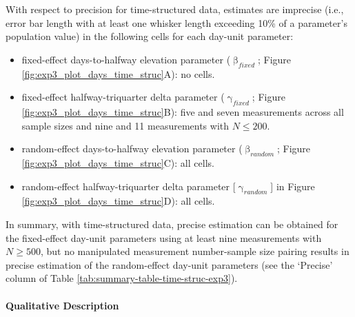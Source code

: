 \documentclass[
12pt, %
twoside,
english]{guelphthesis}
\theoremstyle{definition}
\theoremstyle{definition}
\theoremstyle{definition}
\theoremstyle{definition}
\theoremstyle{remark}
\begin{document}
With respect to precision for time-structured data, estimates are imprecise (i.e., error bar length with at least one whisker length exceeding 10\% of a parameter's population value) in the following cells for each day-unit parameter:
\begin{itemize}
\tightlist
\item
  fixed-effect days-to-halfway elevation parameter (\(\upbeta_{fixed}\); Figure \ref{fig:exp3_plot_days_time_struc}A): no cells.
\item
  fixed-effect halfway-triquarter delta parameter (\(\upgamma_{fixed}\); Figure \ref{fig:exp3_plot_days_time_struc}B): five and seven measurements across all sample sizes and nine and 11 measurements with \(N \le 200\).
\item
  random-effect days-to-halfway elevation parameter (\(\upbeta_{random}\); Figure \ref{fig:exp3_plot_days_time_struc}C): all cells.
\item
  random-effect halfway-triquarter delta parameter {[}\(\upgamma_{random}\){]} in Figure \ref{fig:exp3_plot_days_time_struc}D): all cells.
\end{itemize}
In summary, with time-structured data, precise estimation can be obtained for the fixed-effect day-unit parameters using at least nine measurements with \(N \ge 500\), but no manipulated measurement number-sample size pairing results in precise estimation of the random-effect day-unit parameters (see the `Precise' column of Table \ref{tab:summary-table-time-struc-exp3}).

\hypertarget{qualitative-time-struc-exp3}{%
\paragraph{Qualitative Description}\label{qualitative-time-struc-exp3}}
\end{document}
